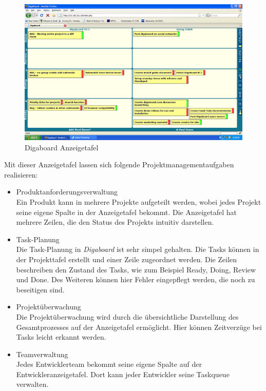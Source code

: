 \begin{description}
\begin{figure}[h]
	\centering
	\includegraphics[width=1.0\textwidth]{images/project_board.png}
	\caption{Digaboard Anzeigetafel}
	\label{fig:digaboard}
\end{figure}

Mit dieser Anzeigetafel lassen sich folgende Projektmanagementaufgaben realisieren:
\begin{itemize}
\item Produktanforderungsverwaltung\\
Ein Produkt kann in mehrere Projekte aufgeteilt werden, wobei jedes Projekt seine eigene Spalte in der Anzeigetafel bekommt. Die Anzeigetafel hat mehrere Zeilen, die den Status des Projekts intuitiv darstellen.

\item Task-Planung\\
Die Task-Planung in \emph{Digaboard} ist sehr simpel gehalten. Die Tasks können in der Projekttafel erstellt und einer Zeile zugeordnet werden. Die Zeilen beschreiben den Zustand des Tasks, wie zum Beispiel Ready, Doing, Review und Done. Des Weiteren können hier Fehler eingepflegt werden, die noch zu beseitigen sind.

\item Projektüberwachung\\
Die Projektüberwachung wird durch die übersichtliche Darstellung des Gesamtprozesses auf der Anzeigetafel ermöglicht. Hier können Zeitverzüge bei Tasks leicht erkannt werden.

\item Teamverwaltung\\
Jedes Entwicklerteam bekommt seine eigene Spalte auf der Entwickleranzeigetafel. Dort kann jeder Entwickler seine Taskqueue verwalten.
\end{itemize}


\end{description}
